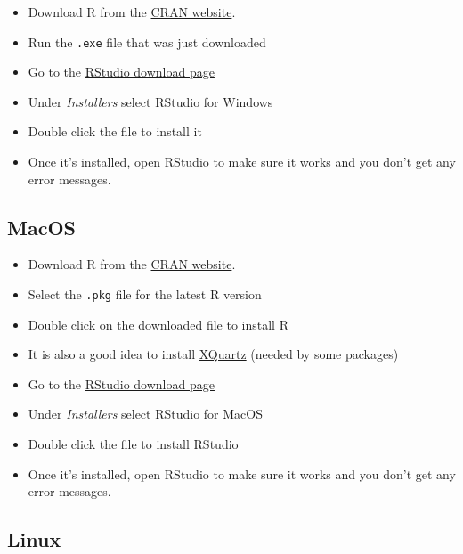 \documentclass[]{book}
\providecommand{\tightlist}{%
  \setlength{\itemsep}{0pt}\setlength{\parskip}{0pt}}
\begin{document}
\begin{itemize}
\tightlist
\item
  Download R from
  the \href{http://cran.r-project.org/bin/windows/base/release.htm}{CRAN website}.
\item
  Run the \texttt{.exe} file that was just downloaded
\item
  Go to the \href{https://www.rstudio.com/products/rstudio/download/\#download}{RStudio download page}
\item
  Under \emph{Installers} select RStudio for Windows
\item
  Double click the file to install it
\item
  Once it's installed, open RStudio to make sure it works and you don't get any
  error messages.
\end{itemize}

\hypertarget{macos}{%
\subsection{MacOS}\label{macos}}

\begin{itemize}
\tightlist
\item
  Download R from
  the \href{http://cran.r-project.org/bin/macosx}{CRAN website}.
\item
  Select the \texttt{.pkg} file for the latest R version
\item
  Double click on the downloaded file to install R
\item
  It is also a good idea to install \href{https://www.xquartz.org/}{XQuartz} (needed
  by some packages)
\item
  Go to the \href{https://www.rstudio.com/products/rstudio/download/\#download}{RStudio download page}
\item
  Under \emph{Installers} select RStudio for MacOS
\item
  Double click the file to install RStudio
\item
  Once it's installed, open RStudio to make sure it works and you don't get any
  error messages.
\end{itemize}

\hypertarget{linux}{%
\subsection{Linux}\label{linux}}
\end{document}
